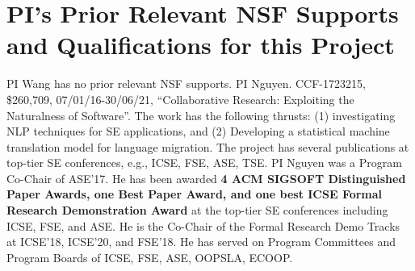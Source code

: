 \section{PI's Prior Relevant NSF Supports and Qualifications for this Project}
\label{prior}

PI Wang has no prior relevant NSF supports.
PI Nguyen. CCF-1723215, \$260,709, 07/01/16-30/06/21, ``Collaborative
Research: Exploiting the Naturalness of Software''.
%
 The work has the following
thrusts: (1) investigating NLP techniques for SE
applications, and (2) Developing a statistical machine translation
model for language migration.
%
The project has several publications at top-tier SE
conferences, e.g., ICSE, FSE, ASE, TSE.
%
PI Nguyen was a Program Co-Chair of ASE'17. He has been
awarded {\bf 4 ACM SIGSOFT Distinguished Paper Awards, one Best Paper
  Award, and one best ICSE Formal Research Demonstration Award} at the
top-tier SE conferences including ICSE, FSE, and ASE.
He is the Co-Chair of the Formal Research Demo Tracks at ICSE'18,
ICSE'20, and FSE'18. He has served on Program Committees and Program
Boards of ICSE, FSE, ASE, OOPSLA, ECOOP.




